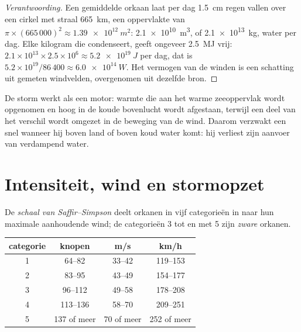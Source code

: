 \begin{proof}[Verantwoording]
Een gemiddelde orkaan laat per dag \qty{1.5}{cm} regen vallen over een cirkel
met straal \qty{665}{km}, een oppervlakte van $\pi \times (665\,000)^2 \approx
\qty{1.39e12}{m^2}$: \qty{2.1e10}{m^3}, of \qty{2.1e13}{kg}, water per dag.
Elke kilogram die condenseert, geeft ongeveer \qty{2.5}{MJ} vrij: $2.1\times10^{13}
\times 2.5\times10^6 \approx \qty{5.2e19}{J}$ per dag, dat is
$5.2\times10^{19}/86\,400 \approx \qty{6.0e14}{W}$. Het vermogen van de winden is
een schatting uit gemeten windvelden, overgenomen uit dezelfde bron.
\end{proof}

De storm werkt als een motor: warmte die aan het warme zeeoppervlak wordt
opgenomen en hoog in de koude bovenlucht wordt afgestaan, terwijl een deel van
het verschil wordt omgezet in de beweging van de wind. Daarom verzwakt een
 snel wanneer hij boven land of boven koud water komt: hij
verliest zijn aanvoer van verdampend water.

\section{Intensiteit, wind en stormopzet}

\begin{definition}\label{def:g10:storms-and-cyclones:scale}
De \emph{schaal van Saffir--Simpson} deelt
orkanen in vijf categorieën in naar hun maximale aanhoudende wind; de
categorieën 3 tot en met 5 zijn \emph{zware} orkanen.
\end{definition}

\begin{center}
\small
\begin{tabular}{cccc}
\hline
categorie & knopen & \unit{m/s} & \unit{km/h} \\
\hline
1 & 64--82 & 33--42 & 119--153 \\
2 & 83--95 & 43--49 & 154--177 \\
3 & 96--112 & 49--58 & 178--208 \\
4 & 113--136 & 58--70 & 209--251 \\
5 & 137 of meer & 70 of meer & 252 of meer \\
\hline
\end{tabular}
\end{center}

